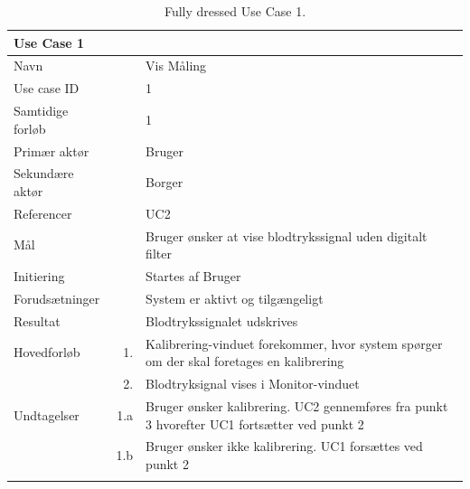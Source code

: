 \begin{longtabu} to  %
    {\large \textbf{Use Case 1}} && \\
    \toprule
    Navn &&    Vis Måling\\
    Use case ID &&    1\\
    Samtidige forløb &&    1\\
    Primær aktør &&    Bruger\\
    Sekundære aktør &&	 Borger\\
    Referencer &&    UC2 \\
    Mål &&    Bruger ønsker at vise blodtrykssignal uden digitalt filter\\
    Initiering &&	Startes af Bruger\\
    Forudsætninger &&  System er aktivt og tilgængeligt\\
    Resultat &&		Blodtrykssignalet udskrives                         \\ \midrule
    Hovedforløb &    1. &    Kalibrering-vinduet forekommer, hvor system spørger om der skal foretages en kalibrering\\								
    			&    2. &    Blodtryksignal vises i Monitor-vinduet\newline\\ \midrule
                
    Undtagelser &    1.a &   Bruger ønsker kalibrering. UC2 gennemføres fra punkt 3 hvorefter UC1 fortsætter ved punkt 2\\[-1ex]
    			&	 1.b	 &	 Bruger ønsker ikke kalibrering. UC1 forsættes ved punkt 2   \\ \bottomrule
\caption{Fully dressed Use Case 1.}
\label{UC1}
\end{longtabu}


